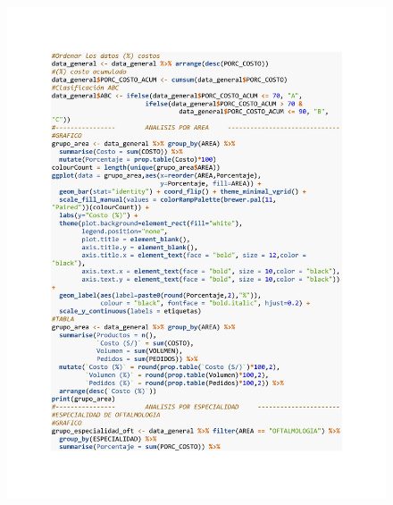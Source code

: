 \begin{figure}[h!]
        \begin{tcolorbox}[colback=white, colframe=black, boxrule=1.5pt, sharp corners=all]
            {\includegraphics[width=\linewidth, height=22cm, trim=2.5cm 2.75cm 2.5cm 2.5cm, clip]{images/script2.pdf}}
        \end{tcolorbox}
\end{figure}

